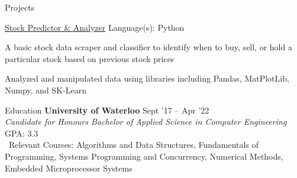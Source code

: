 \documentclass{resume} %
\newcommand{\ExternalLink}{%
    \tikz[x=1.2ex, y=1.2ex, baseline=-0.05ex]{%
        \begin{scope}[x=1ex, y=1ex]
            \clip (-0.1,-0.1) 
                --++ (-0, 1.2) 
                --++ (0.6, 0) 
                --++ (0, -0.6) 
                --++ (0.6, 0) 
                --++ (0, -1);
            \path[draw, 
                line width = 0.5, 
                rounded corners=0.5] 
                (0,0) rectangle (1,1);
        \end{scope}
        \path[draw, line width = 0.5] (0.5, 0.5) 
            -- (1, 1);
        \path[draw, line width = 0.5] (0.6, 1) 
            -- (1, 1) -- (1, 0.6);
        }
    }
\begin{document}
\begin{rSection}{Projects}

  \begin{rWorkSection}{\href{https://github.com/tharseken/Stock-Predictor-and-Analyzer}{Stock Predictor \& Analyzer}}
                      {}
                      {\textnormal{Language(s):} Python}
                      {}
    \item A basic stock data scraper and classifier to identify when to buy, sell, or hold a particular stock based on previous stock prices
    \item Analyzed and manipulated data using libraries including Pandas, MatPlotLib, Numpy, and SK-Learn
  
  \end{rWorkSection}
  
  \vspace{-0.1em}

  \end{rSection}


\begin{rSection}{Education}
  {\bf University of Waterloo} \hfill {Sept '17 -- Apr '22}\\
  {\em Candidate for Honours Bachelor of Applied Science in Computer Engineering} \hfill {GPA: 3.3}\\
  {\ Relevant Courses: Algorithms and Data Structures, Fundamentals of Programming, Systems Programming and Concurrency, Numerical Methods, Embedded
  Microprocessor Systems} \\
  \vspace{0.5em}
\end{rSection}
\end{document}
